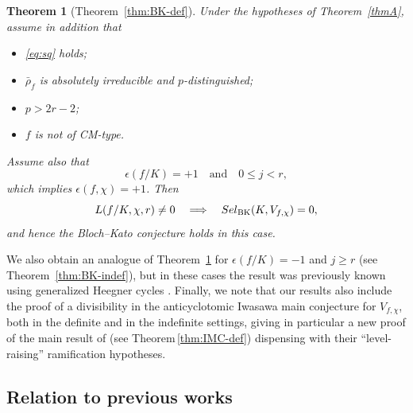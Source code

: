\documentclass[10pt,letterpaper]{amsart}
\theoremstyle{plain}
\newtheorem{thm}{Theorem}[subsection] %
\theoremstyle{definition}
\theoremstyle{definition}
\theoremstyle{plain}
\theoremstyle{plain}
\theoremstyle{plain}
\theoremstyle{remark}
\numberwithin{equation}{section}
\newcommand{\Sel}{Sel}
\def\Sel{{\rm Sel}}
\begin{document}
{\begin{thm}[Theorem~\ref{thm:BK-def}] %
\label{thmC}
Under the hypotheses of Theorem~\ref{thmA}, assume in addition  that
\begin{itemize}
    \item \eqref{eq:sq} holds;
    \item $\bar{\rho}_f$ is absolutely irreducible and $p$-distinguished;
    \item $p>2r-2$;
    \item $f$ is not of CM-type.
\end{itemize}
Assume also that
\[
\epsilon(f/K)=+1\quad\textrm{and}\quad 0\leq j< r,
\]
which implies $\epsilon(f,\chi)=+1$. Then
\[
L(f/K,\chi,r)\neq 0\quad\Longrightarrow\quad\Sel_{\mathrm{BK}}(K,V_{f,\chi})=0,
\]
and hence the Bloch--Kato conjecture holds in this case.
\end{thm}

We also obtain an analogue of Theorem~\ref{thmC} for $\epsilon(f/K)=-1$ and $j\geq r$ %
(see Theorem~\ref{thm:BK-indef}), but in these cases the result was previously known using generalized Heegner cycles \cite{cas-hsieh1}. Finally, we note 
that our results also include the proof of a divisibility in the anticyclotomic Iwasawa main conjecture for $V_{f,\chi}$, 
both in the definite and in the indefinite settings, giving in particular a new proof of the main result of \cite{bdIMC} (see Theorem\,\ref{thm:IMC-def}) dispensing with their ``level-raising'' ramification hypotheses. 


\subsection{Relation to previous works}\label{subsec:previous}

}
\end{document}
